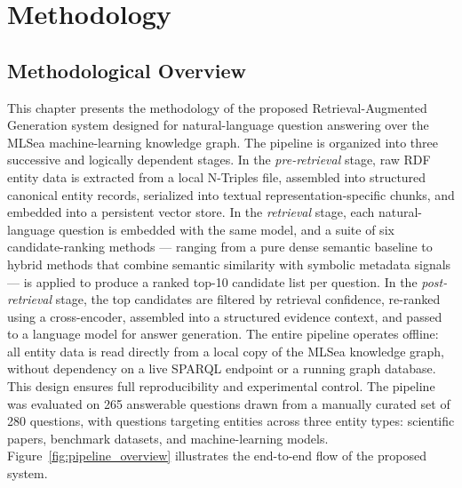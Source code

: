 %

\chapter{Methodology}
\label{ch:methodology}

\section{Methodological Overview}
\label{sec:overview}

This chapter presents the methodology of the proposed Retrieval-Augmented
Generation system designed for natural-language question answering over the
MLSea machine-learning knowledge graph.
The pipeline is organized into three successive and logically dependent stages.
In the \emph{pre-retrieval} stage, raw RDF entity data is extracted from a local
N-Triples file, assembled into structured canonical entity records, serialized
into textual representation-specific chunks, and embedded into a persistent
vector store.
In the \emph{retrieval} stage, each natural-language question is embedded with
the same model, and a suite of six candidate-ranking methods --- ranging from a
pure dense semantic baseline to hybrid methods that combine semantic similarity
with symbolic metadata signals --- is applied to produce a ranked top-10
candidate list per question.
In the \emph{post-retrieval} stage, the top candidates are filtered by retrieval
confidence, re-ranked using a cross-encoder, assembled into a structured evidence
context, and passed to a language model for answer generation.
The entire pipeline operates offline: all entity data is read directly from a
local copy of the MLSea knowledge graph, without dependency on a live SPARQL
endpoint or a running graph database.
This design ensures full reproducibility and experimental control.
The pipeline was evaluated on 265 answerable questions drawn from a manually
curated set of 280 questions, with questions targeting entities across three
entity types: scientific papers, benchmark datasets, and machine-learning models.
Figure~\ref{fig:pipeline_overview} illustrates the end-to-end flow of the
proposed system.

